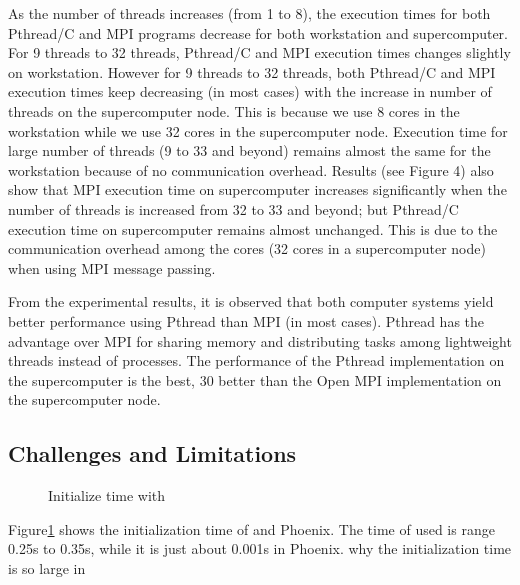 As the number of threads increases (from 1 to 8), the
execution times for both Pthread/C and MPI programs decrease
for both workstation and supercomputer. For 9 threads to 32
threads, Pthread/C and MPI execution times changes slightly
on workstation. However for 9 threads to 32 threads, both
Pthread/C and MPI execution times keep decreasing (in most
cases) with the increase in number of threads on the
supercomputer node. This is because we use 8 cores in the
workstation while we use 32 cores in the supercomputer node.
Execution time for large number of threads (9 to 33 and
beyond) remains almost the same for the workstation because
of no communication overhead. Results (see Figure 4) also
show that MPI execution time on supercomputer increases
significantly when the number of threads is increased from 32
to 33 and beyond; but Pthread/C execution time on
supercomputer remains almost unchanged. This is due to the
communication overhead among the cores (32 cores in a
supercomputer node) when using MPI message passing.

From the
experimental results, it is observed that both computer systems
yield better performance using Pthread than MPI (in most
cases). Pthread has the advantage over MPI for sharing
memory and distributing tasks among lightweight threads
instead of processes. The performance of the Pthread
implementation on the supercomputer is the best, 30%
better than the Open MPI implementation on the
supercomputer node.

\subsection{ Challenges and Limitations}
\begin{figure}[htpb]
\centering
  \caption{Initialize time with \myds}
   \label{fig:init}
\end{figure}
Figure\ref{fig:init} shows the initialization time of \myds and Phoenix.
The time of \myds used is range 0.25s to  0.35s, 
while it is just about 0.001s in Phoenix.
{\color{red} why the initialization time is so large in \myds}

